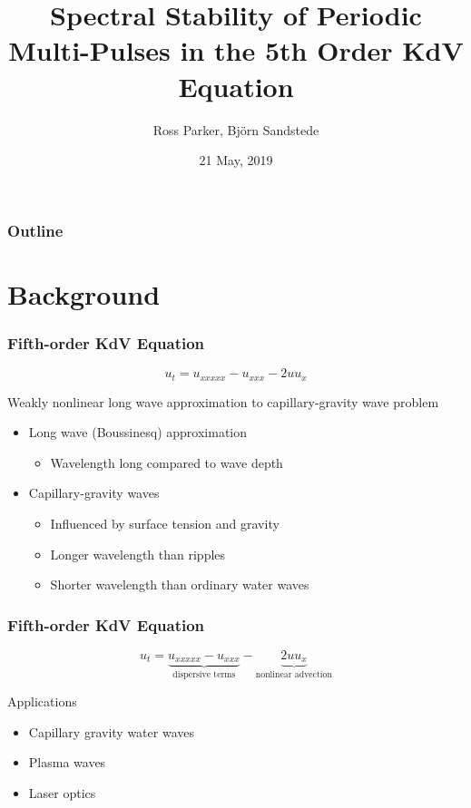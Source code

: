 \documentclass[16pt]{beamer}
\title[Stability of Multi-Pulses]{Spectral Stability of Periodic Multi-Pulses in the 5th Order KdV Equation}
\author[R. Parker]{Ross Parker, Bj\"{o}rn Sandstede}
\institute{Brown University}
\date{21 May, 2019}
\begin{document}
 
\frame{\titlepage}
 
\begin{frame}
\frametitle{Outline}
\tableofcontents
\end{frame}

\section{Background}

\begin{frame}
	\frametitle{Fifth-order KdV Equation }   
	\fontsize{16}{7.2}\selectfont
	\begin{center}
		\[ u_t = u_{xxxxx} - u_{xxx} - 2 u u_x \]
	\end{center}
	\vspace{0.5cm}
	Weakly nonlinear long wave approximation to capillary-gravity wave problem
	\vspace{0.5cm}
	\begin{itemize}
		\item Long wave (Boussinesq) approximation
		\begin{itemize} 
			\item Wavelength long compared to wave depth
		\end{itemize}
		\item Capillary-gravity waves
		\begin{itemize}
		    \item Influenced by surface tension and gravity
		    \item Longer wavelength than ripples
		    \item Shorter wavelength than ordinary water waves 
		\end{itemize}
	\end{itemize}
\end{frame}

\begin{frame}
	\frametitle{Fifth-order KdV Equation}
	\fontsize{16}{7.2}\selectfont
	\begin{description}
		\item
			\begin{center}
			\[ u_t = \underbrace{u_{xxxxx} - u_{xxx}}_{\text{dispersive terms}} - \underbrace{ 2 u u_x}_{\text{nonlinear advection}} \]
			\end{center}
		\vspace{0.5cm}

		Applications
		\begin{itemize}
			\item Capillary gravity water waves
			\vspace{0.25cm}	
			\item Plasma waves
			\vspace{0.25cm}
			\item Laser optics
		\end{itemize}
	\end{description}
\end{frame}
\end{document}
